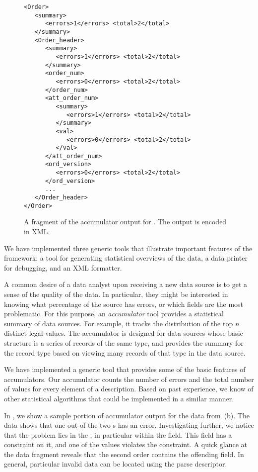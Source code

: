 \begin{figure}
  \centering
  \scriptsize
\begin{verbatim}
<Order>
   <summary>
      <errors>1</errors> <total>2</total>        
   </summary>
   <Order_header>
      <summary>
         <errors>1</errors> <total>2</total>        
      </summary>
      <order_num>
         <errors>0</errors> <total>2</total>        
      </order_num>
      <att_order_num>
         <summary>
            <errors>1</errors> <total>2</total>        
         </summary>
         <val>
            <errors>0</errors> <total>2</total>                
         </val>
      </att_order_num>
      <ord_version>
         <errors>0</errors> <total>2</total>                
      </ord_version>
      ...
   </Order_header>
</Order>
\end{verbatim}  
  \caption{A fragment of the accumulator output for \dibbler{}. The
    output is encoded in XML.}
  \label{fig:gentool-acc-output}
\end{figure}

We have implemented three generic tools that illustrate important
features of the framework: a tool for generating statistical
overviews of the data, a data printer for debugging, and an XML
formatter.

A common desire of a data analyst upon receiving a new data source is
to get a sense of the quality of the data. In particular, they might
be interested in knowing what percentage of the source has errors, or
which fields are the most problematic. For this purpose, an
\emph{accumulator} tool provides a statistical summary of data
sources. For example, it tracks the distribution of the top $n$
distinct legal values. The accumulator is designed for data sources
whose basic structure is a series of records of the same type, and
provides the summary for the record type based on viewing many records
of that type in the data source.

We have implemented a generic tool that provides some of the basic
features of accumulators. Our accumulator counts the number of errors
and the total number of values for every element of a description.
Based on past experience, we know of other statistical algorithms that
could be implemented in a similar manner.

In , we show a sample portion of
accumulator output for the \dibbler{} data
from~(b). The data shows that one out of
the two s has an error. Investigating further, we notice
that the problem lies in the , in particular within
the  field.  This field has a constraint on it, and
one of the values violates the constraint. A quick glance at the data
fragment reveals that the second order contains the offending field.
In general, particular invalid data can be located using the parse
descriptor.


